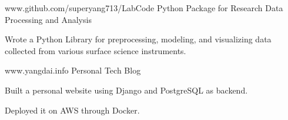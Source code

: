 


\begin{cventries}


\cventry
{www.github.com/superyang713/LabCode}
{Python Package for Research Data Processing and Analysis}
{}
{}
{
\begin{cvitems}
\item {Wrote a Python Library for preprocessing, modeling, and visualizing data
    collected from various surface science instruments.}
\end{cvitems}
}


\cventry
{www.yangdai.info}
{Personal Tech Blog}
{}
{}
{
\begin{cvitems}
\item {Built a personal website using Django and PostgreSQL
    as backend.}
\item {Deployed it on AWS through Docker.}
\end{cvitems}
}


\end{cventries}


